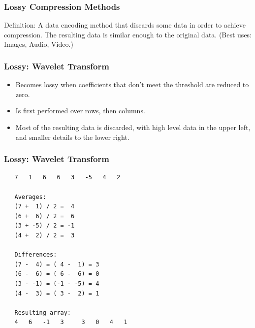 \documentclass{beamer}
\begin{document}
\begin{frame}
   \frametitle{Lossy Compression Methods}
   Definition: A data encoding method that discards some data in order to achieve compression. The resulting data is similar enough to the original data. (Best uses: Images, Audio, Video.)
\end{frame}

\begin{frame}
   \frametitle{Lossy: Wavelet Transform}
   \begin{itemize}
   \item{Becomes lossy when coefficients that don't meet the threshold are reduced to zero.}
   \item{Is first performed over rows, then columns.}
   \item{Most of the resulting data is discarded, with high level data in the upper left, and smaller details to the lower right.}
   \end{itemize}
\end{frame}


\begin{frame}[fragile]
   \frametitle{Lossy: Wavelet Transform}
   \begin{verbatim}
   7   1   6   6   3   -5   4   2

   Averages:
   (7 +  1) / 2 =  4
   (6 +  6) / 2 =  6
   (3 + -5) / 2 = -1
   (4 +  2) / 2 =  3

   Differences:
   (7 -  4) = ( 4 -  1) = 3
   (6 -  6) = ( 6 -  6) = 0
   (3 - -1) = (-1 - -5) = 4
   (4 -  3) = ( 3 -  2) = 1

   Resulting array:
   4   6   -1   3	  3   0   4   1

   \end{verbatim}
\end{frame}
\end{document}
